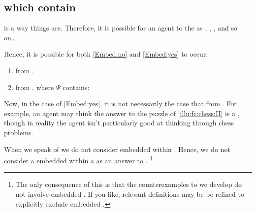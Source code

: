 \subsection*{ which contain }


\begin{note}
   is a way things are.
  Therefore, it is possible for an agent to \eval{} the \prop{}  as , , , and so on\dots.

  Hence, it is possible for both \ref{Embed:no} and \ref{Embed:yes} to occur:

  \begin{enumerate}[label=\arabic*., ref=(\arabic*)]
  \item
    \label{Embed:no}
     from .
  \item
    \label{Embed:yes}
     from , where \(\Psi\) contains:

  \end{enumerate}

  Now, in the case of \ref{Embed:yes}, it is not necessarily the case that  from .
  For example, an agent may think the answer to the puzzle of \autoref{illu:fc:chess:II} is a \fc{}, though in reality the agent isn't particularly good at thinking through chess problems.

  When we speak of \fingfr{} we do not consider  embedded within \fingfr{}.
  Hence, we do not consider a \fingfr{} embedded within a \fingfr{} as an answer to \qWhy{}.%
  \footnote{
    The only consequence of this is that the counterexamples to \issueInclusion{} we develop do not involve embedded \fingfr{}.
    If you like, relevant definitions may be be refined to explicitly exclude embedded .
  }
\end{note}






